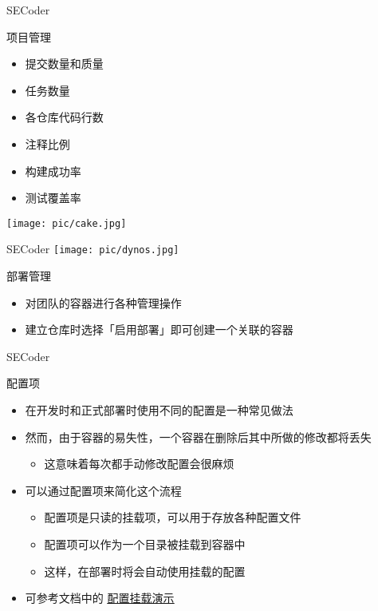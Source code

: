 \documentclass{beamer}
\begin{document}
\begin{frame}{SECoder}
    \begin{minipage}{0.35\linewidth}
        \begin{block}{项目管理}
            \begin{itemize}
                \item 提交数量和质量
                \item 任务数量
                \item 各仓库代码行数
                \item 注释比例
                \item 构建成功率
                \item 测试覆盖率
            \end{itemize}
        \end{block}
    \end{minipage}
    \begin{minipage}{0.6\linewidth}
        \centering\texttt{[image: pic/cake.jpg]}
    \end{minipage}
\end{frame}

\begin{frame}{SECoder}
    \centering\texttt{[image: pic/dynos.jpg]}
    \begin{block}{部署管理}
        \begin{itemize}
        \item 对团队的容器进行各种管理操作
        \item 建立仓库时选择「启用部署」即可创建一个关联的容器
        \end{itemize}
    \end{block}
\end{frame}

\begin{frame}{SECoder}
    \begin{block}{配置项}
        \begin{itemize}
            \item 在开发时和正式部署时使用不同的配置是一种常见做法
            \item 然而，由于容器的易失性，一个容器在删除后其中所做的修改都将丢失
            \begin{itemize}\item 这意味着每次都手动修改配置会很麻烦
            \end{itemize}
            \item 可以通过配置项来简化这个流程
            \begin{itemize}\item 配置项是只读的挂载项，可以用于存放各种配置文件
            \item 配置项可以作为一个目录被挂载到容器中
            \item 这样，在部署时将会自动使用挂载的配置
            \end{itemize}
            \item 可参考文档中的 \href{https://thuse-course.github.io/course-index/deploy/secoder/\#\_12}{\underline{配置挂载演示}}
        \end{itemize}
    \end{block}
\end{frame}
\end{document}
